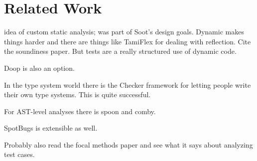 \section{Related Work}

idea of custom static analysis; was part of Soot's design goals. Dynamic makes things harder and there are things like TamiFlex for dealing with reflection. Cite the soundiness paper. But tests are a really structured use of dynamic code.

Doop is also an option.

In the type system world there is the Checker framework for letting people write their own type systems. This is quite successful.

For AST-level analyses there is spoon and comby.

SpotBugs is extensible as well.

Probably also read the focal methods paper and see what it says about analyzing test cases.



